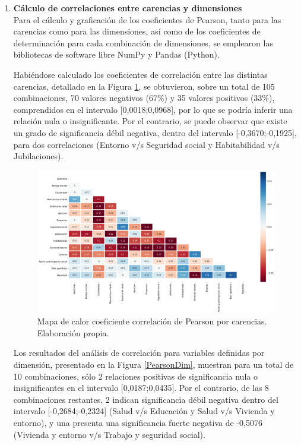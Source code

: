 \documentclass[12pt,letterpaper,spanish]{article}
\begin{document}
\begin{enumerate}
 \item \textbf{Cálculo de correlaciones entre carencias y dimensiones}\\
 Para el cálculo y graficación de los coeficientes de Pearson, tanto para las carencias como para las dimensiones, así como de los coeficientes de determinación para cada combinación de dimensiones, se emplearon las bibliotecas de software libre NumPy y Pandas (Python).
 
 Habiéndose calculado los coeficientes de correlación entre las distintas carencias, detallado en la Figura \ref{pearsoncarencias}, se obtuvieron, sobre un total de 105 combinaciones, 70 valores negativos (67\%) y 35 valores positivos (33\%), comprendidos en el intervalo [0,0018;0,0968], por lo que se podría inferir una relación nula o insignificante. Por el contrario, se puede observar que existe un grado de significancia débil negativa, dentro del intervalo [-0,3670;-0,1925], para dos correlaciones (Entorno v/s Seguridad social y Habitabilidad v/s Jubilaciones). 
\begin{figure}[H]
    \centering
        \includegraphics[width=\linewidth]{Heatmaps/Heatmap_pearson_Correlaciones.png}
    \caption{Mapa de calor coeficiente correlación de Pearson por carencias. Elaboración propia.}
    \label{pearsoncarencias}
\end{figure}

Los resultados del análisis de correlación para variables definidas por dimensión, presentado en la Figura \ref{PearsonDim}, muestran para un total de 10 combinaciones, sólo 2 relaciones positivas de significancia nula o insignificantes en el intervalo [0,0187;0,0435]. Por el contrario, de las 8 combinaciones restantes, 2 indican significancia débil negativa dentro del intervalo [-0,2684;-0,2324] (Salud v/s Educación y Salud v/s Vivienda y entorno), y una presenta una significancia fuerte negativa de -0,5076 (Vivienda y entorno v/s Trabajo y seguridad social).


\end{enumerate}
\end{document}
